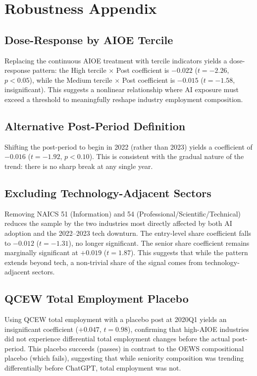 \documentclass[12pt]{article}
\begin{document}
\section{Robustness Appendix}
\label{app:robustness}

\subsection{Dose-Response by AIOE Tercile}

Replacing the continuous AIOE treatment with tercile indicators yields a dose-response pattern: the High tercile $\times$ Post coefficient is $-0.022$ ($t = -2.26$, $p < 0.05$), while the Medium tercile $\times$ Post coefficient is $-0.015$ ($t = -1.58$, insignificant). This suggests a nonlinear relationship where AI exposure must exceed a threshold to meaningfully reshape industry employment composition.

\subsection{Alternative Post-Period Definition}

Shifting the post-period to begin in 2022 (rather than 2023) yields a coefficient of $-0.016$ ($t = -1.92$, $p < 0.10$). This is consistent with the gradual nature of the trend: there is no sharp break at any single year.

\subsection{Excluding Technology-Adjacent Sectors}

Removing NAICS 51 (Information) and 54 (Professional/Scientific/Technical) reduces the sample by the two industries most directly affected by both AI adoption and the 2022--2023 tech downturn. The entry-level share coefficient falls to $-0.012$ ($t = -1.31$), no longer significant. The senior share coefficient remains marginally significant at $+0.019$ ($t = 1.87$). This suggests that while the pattern extends beyond tech, a non-trivial share of the signal comes from technology-adjacent sectors.

\subsection{QCEW Total Employment Placebo}

Using QCEW total employment with a placebo post at 2020Q1 yields an insignificant coefficient ($+0.047$, $t = 0.98$), confirming that high-AIOE industries did not experience differential total employment changes before the actual post-period. This placebo succeeds (passes) in contrast to the OEWS compositional placebo (which fails), suggesting that while seniority composition was trending differentially before ChatGPT, total employment was not.
\end{document}
